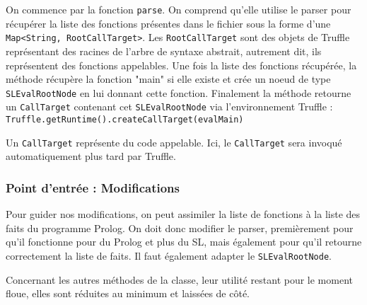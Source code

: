 \documentclass[../report.tex]{subfiles}
\begin{document}
On commence par la fonction \texttt{parse}. On comprend qu'elle utilise le parser pour récupérer la liste des fonctions présentes dans le fichier sous la forme d'une \texttt{Map<String, RootCallTarget>}. Les \texttt{RootCallTarget} sont des objets de Truffle représentant des racines de l'arbre de syntaxe abstrait, autrement dit, ils représentent des fonctions appelables. Une fois la liste des fonctions récupérée, la méthode récupère la fonction "main" si elle existe et crée un noeud de type \texttt{SLEvalRootNode} en lui donnant cette fonction. Finalement la méthode retourne un \texttt{CallTarget} contenant cet \texttt{SLEvalRootNode} via l'environnement Truffle :\\
\texttt{Truffle.getRuntime().createCallTarget(evalMain)}

Un \texttt{CallTarget} représente du code appelable. Ici, le \texttt{CallTarget} sera invoqué automatiquement plus tard par Truffle.
\subsubsection{Point d'entrée : Modifications}
Pour guider nos modifications, on peut assimiler la liste de fonctions à la liste des faits du programme Prolog. On doit donc modifier le parser, premièrement pour qu'il fonctionne pour du Prolog et plus du SL, mais également pour qu'il retourne correctement la liste de faits. Il faut également adapter le \texttt{SLEvalRootNode}.

Concernant les autres méthodes de la classe, leur utilité restant pour le moment floue, elles sont réduites au minimum et laissées de côté.
\end{document}
